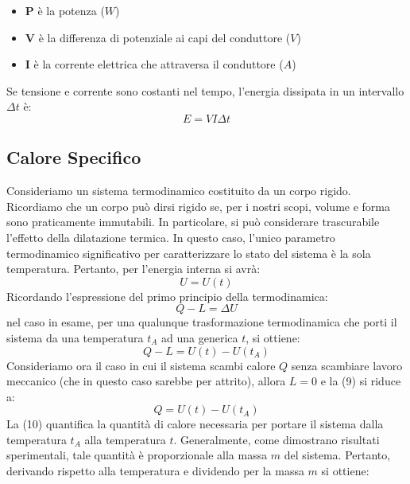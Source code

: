\begin{itemize}
	\item \textbf{P} è la potenza ($W$)
	\item \textbf{V} è la differenza di potenziale ai capi del conduttore ($V$)
	\item \textbf{I} è la corrente elettrica che attraversa il conduttore ($A$)
\end{itemize}
Se tensione e corrente sono costanti nel tempo, l'energia dissipata in un intervallo $\Delta t$ è:
\begin{equation}
	E = VI\Delta t
\end{equation}





\subsection{Calore Specifico}
Consideriamo un sistema termodinamico costituito da un corpo rigido. Ricordiamo che un corpo può dirsi rigido se, per i nostri scopi, volume e forma sono praticamente immutabili. In particolare, si può considerare trascurabile l'effetto della dilatazione termica. In questo caso, l'unico parametro termodinamico significativo per caratterizzare lo stato del sistema è la sola temperatura. Pertanto, per l'energia interna si avrà:
\begin{equation}
	U = U(t)
\end{equation}
Ricordando l'espressione del primo principio della termodinamica:
\begin{equation}
	Q -L = \Delta U 
\end{equation}
nel caso in esame, per una qualunque trasformazione termodinamica che porti il sistema da una temperatura $t_A$ ad una generica $t$, si ottiene:
\begin{equation}
	Q - L = U(t) - U(t_A)
\end{equation}
Consideriamo ora il caso in cui il sistema scambi calore $Q$ senza scambiare lavoro meccanico (che in questo caso sarebbe per attrito), allora $L = 0$ e la (9) si riduce a:
\begin{equation}
	Q = U(t) - U(t_A)
\end{equation}
La (10) quantifica la quantità di calore necessaria per portare il sistema dalla temperatura $t_A$ alla temperatura $t$. Generalmente, come dimostrano risultati sperimentali, tale quantità è proporzionale alla massa $m$ del sistema. Pertanto, derivando rispetto alla temperatura e dividendo per la massa $m$ si ottiene:
